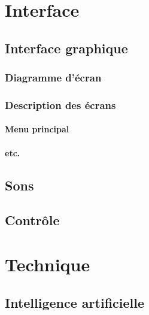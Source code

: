 \documentclass[a4paper, 11pt]{report}
\begin{document}
  \part{Interface}
    \chapter{Interface graphique}
      \section{Diagramme d'écran}

      \section{Description des écrans}
        \subsection{Menu principal}
        
        \subsection{etc.}

    \chapter{Sons}

    \chapter{Contrôle}

  \part{Technique}
    
    \chapter{Intelligence artificielle}
      
\end{document}
